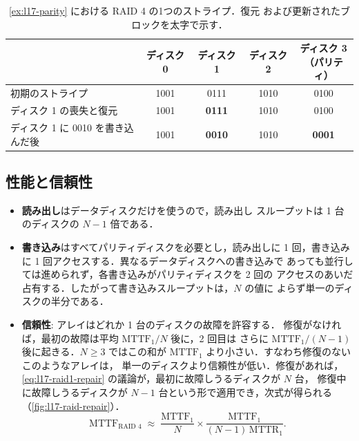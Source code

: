 \documentclass[../main.tex]{subfiles}
\begin{document}
\begin{table}[htbp]
  \centering\footnotesize
  \caption{\cref{ex:l17-parity} における RAID 4 の1つのストライプ．復元
    および更新されたブロックを太字で示す．}
  \label{tab:l17-parity}
  \begin{tabular}{@{}lcccc@{}}
    \toprule
    & ディスク 0 & ディスク 1 & ディスク 2 & \shortstack{ディスク 3\\（パリティ）} \\
    \midrule
    初期のストライプ                  & 1001 & 0111 & 1010 & 0100 \\
    ディスク 1 の喪失と復元           & 1001 & \textbf{0111} & 1010 & 0100 \\
    ディスク 1 に 0010 を書き込んだ後 & 1001 & \textbf{0010} & 1010 & \textbf{0001} \\
    \bottomrule
  \end{tabular}
\end{table}

\subsection{性能と信頼性}

\begin{itemize}
  \item \textbf{読み出し}はデータディスクだけを使うので，読み出し
    スループットは 1 台のディスクの $N-1$ 倍である．
  \item \textbf{書き込み}はすべてパリティディスクを必要とし，読み出しに
    1 回，書き込みに 1 回アクセスする．異なるデータディスクへの書き込みで
    あっても並行しては進められず，各書き込みがパリティディスクを 2 回の
    アクセスのあいだ占有する．したがって書き込みスループットは，$N$ の値に
    よらず単一のディスクの半分である．
  \item \textbf{信頼性}: アレイはどれか 1 台のディスクの故障を許容する．
    修復がなければ，最初の故障は平均 $\mathrm{MTTF}_1/N$ 後に，2 回目は
    さらに $\mathrm{MTTF}_1/(N-1)$ 後に起きる．$N \ge 3$ ではこの和が
    $\mathrm{MTTF}_1$ より小さい．すなわち修復のないこのようなアレイは，
    単一のディスクより信頼性が低い．修復があれば，
    \cref{eq:l17-raid1-repair} の議論が，最初に故障しうるディスクが $N$ 台，
    修復中に故障しうるディスクが $N-1$ 台という形で適用でき，次式が得られる
    （\cref{fig:l17-raid-repair}）．
    \begin{equation}
      \mathrm{MTTF}_{\text{RAID 4}} \;\approx\;
      \frac{\mathrm{MTTF}_1}{N} \times
      \frac{\mathrm{MTTF}_1}{(N-1)\,\mathrm{MTTR}_1} .
      \label{eq:l17-raid4}
    \end{equation}
\end{itemize}
\end{document}
